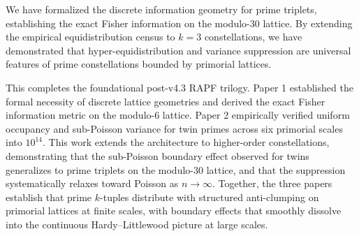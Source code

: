 \documentclass[11pt]{article}
\begin{document}
We have formalized the discrete information geometry for prime triplets, establishing the exact Fisher information on the modulo-30 lattice. By extending the empirical equidistribution census to $k=3$ constellations, we have demonstrated that hyper-equidistribution and variance suppression are universal features of prime constellations bounded by primorial lattices. 

This completes the foundational post-v4.3 RAPF trilogy. Paper 1 established the formal necessity of discrete lattice geometries and derived the exact Fisher information metric on the modulo-6 lattice. Paper 2 empirically verified uniform occupancy and sub-Poisson variance for twin primes across six primorial scales into $10^{14}$. This work extends the architecture to higher-order constellations, demonstrating that the sub-Poisson boundary effect observed for twins generalizes to prime triplets on the modulo-30 lattice, and that the suppression systematically relaxes toward Poisson as $n \to \infty$. Together, the three papers establish that prime $k$-tuples distribute with structured anti-clumping on primorial lattices at finite scales, with boundary effects that smoothly dissolve into the continuous Hardy--Littlewood picture at large scales.
\end{document}
